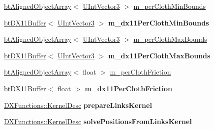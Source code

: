 \begin{DoxyCompactItemize}
\item 
\hyperlink{classbt_aligned_object_array}{bt\+Aligned\+Object\+Array}$<$ \hyperlink{structbt_d_x11_soft_body_solver_1_1_u_int_vector3}{U\+Int\+Vector3} $>$ \hyperlink{classbt_d_x11_soft_body_solver_a33d4d4714b9f20c781d059aeaaf629db}{m\+\_\+per\+Cloth\+Min\+Bounds}
\item 
\hypertarget{classbt_d_x11_soft_body_solver_a3c03a0d3f1793057d0dee13ad766d340}{\hyperlink{classbt_d_x11_buffer}{bt\+D\+X11\+Buffer}$<$ \hyperlink{structbt_d_x11_soft_body_solver_1_1_u_int_vector3}{U\+Int\+Vector3} $>$ {\bfseries m\+\_\+dx11\+Per\+Cloth\+Min\+Bounds}}\label{classbt_d_x11_soft_body_solver_a3c03a0d3f1793057d0dee13ad766d340}

\item 
\hyperlink{classbt_aligned_object_array}{bt\+Aligned\+Object\+Array}$<$ \hyperlink{structbt_d_x11_soft_body_solver_1_1_u_int_vector3}{U\+Int\+Vector3} $>$ \hyperlink{classbt_d_x11_soft_body_solver_a5bf7a1f6d509532fa79f8805aa86c573}{m\+\_\+per\+Cloth\+Max\+Bounds}
\item 
\hypertarget{classbt_d_x11_soft_body_solver_abd1bfe406d9ee3d72e6e0efe3b9dec7d}{\hyperlink{classbt_d_x11_buffer}{bt\+D\+X11\+Buffer}$<$ \hyperlink{structbt_d_x11_soft_body_solver_1_1_u_int_vector3}{U\+Int\+Vector3} $>$ {\bfseries m\+\_\+dx11\+Per\+Cloth\+Max\+Bounds}}\label{classbt_d_x11_soft_body_solver_abd1bfe406d9ee3d72e6e0efe3b9dec7d}

\item 
\hyperlink{classbt_aligned_object_array}{bt\+Aligned\+Object\+Array}$<$ float $>$ \hyperlink{classbt_d_x11_soft_body_solver_a2f75ea13de95ded3fb3dc1f205ad4f69}{m\+\_\+per\+Cloth\+Friction}
\item 
\hypertarget{classbt_d_x11_soft_body_solver_a9de7b0c3b6948f5d4491b6924251e880}{\hyperlink{classbt_d_x11_buffer}{bt\+D\+X11\+Buffer}$<$ float $>$ {\bfseries m\+\_\+dx11\+Per\+Cloth\+Friction}}\label{classbt_d_x11_soft_body_solver_a9de7b0c3b6948f5d4491b6924251e880}

\item 
\hypertarget{classbt_d_x11_soft_body_solver_a5b2c07550318a0dbea813e6f4b774058}{\hyperlink{class_d_x_functions_1_1_kernel_desc}{D\+X\+Functions\+::\+Kernel\+Desc} {\bfseries prepare\+Links\+Kernel}}\label{classbt_d_x11_soft_body_solver_a5b2c07550318a0dbea813e6f4b774058}

\item 
\hypertarget{classbt_d_x11_soft_body_solver_a46d56cb30e537b2eb67a27a2facdbb7c}{\hyperlink{class_d_x_functions_1_1_kernel_desc}{D\+X\+Functions\+::\+Kernel\+Desc} {\bfseries solve\+Positions\+From\+Links\+Kernel}}\label{classbt_d_x11_soft_body_solver_a46d56cb30e537b2eb67a27a2facdbb7c}


\end{DoxyCompactItemize}
